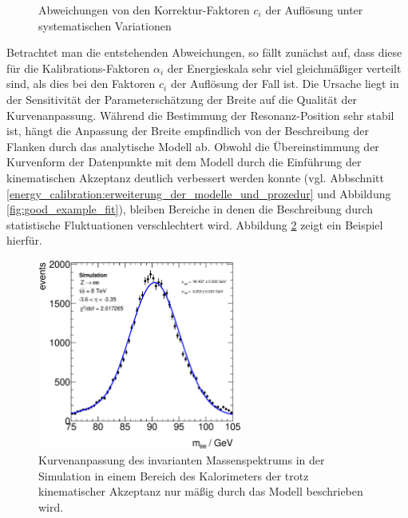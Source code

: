 \begin{figure}[h]
\begin{minipage}[t]{0.48\textwidth}
        \captionsetup{format=plain}
        \caption{Abweichungen von den Korrektur-Faktoren $c_i$ der
        Auflösung unter systematischen Variationen}
        \label{fig:cdata_uncert}
    \end{minipage}
\end{figure}

Betrachtet man die entstehenden Abweichungen, so fällt zunächst auf, dass diese
für die Kalibrations-Faktoren $\alpha_i$ der Energieskala sehr viel
gleichmäßiger verteilt sind, als dies bei den Faktoren $c_i$ der Auflösung der
Fall ist. Die Ursache liegt in der Sensitivität der Parameterschätzung der
Breite auf die Qualität der Kurvenanpassung. Während die Bestimmung der
Resonanz-Position sehr stabil ist, hängt die Anpassung der Breite
empfindlich von der Beschreibung der Flanken durch das analytische Modell ab.
Obwohl die Übereinstimmung der Kurvenform der Datenpunkte mit dem Modell durch
die Einführung der kinematischen Akzeptanz deutlich verbessert werden konnte
(vgl.  Abbschnitt \ref{energy_calibration:erweiterung_der_modelle_und_prozedur}
und Abbildung \ref{fig:good_example_fit}), bleiben Bereiche in denen die
Beschreibung durch statistische Fluktuationen verschlechtert wird. Abbildung
\ref{fig:still_bad_fit} zeigt ein Beispiel hierfür.

\begin{figure}
    \centering
    \includegraphics[width=0.6\textwidth]{plots/still_bad_fit}
    \caption[Kurvenanpassung des inv. Massenspektrums in einem Bereich, der
        trotz kinematischer Akzeptanz schlecht beschrieben wird]
        {Kurvenanpassung des invarianten Massenspektrums in der Simulation in
        einem Bereich des Kalorimeters der trotz kinematischer Akzeptanz nur
        mäßig durch das Modell beschrieben wird.}
    \label{fig:still_bad_fit}
\end{figure}

